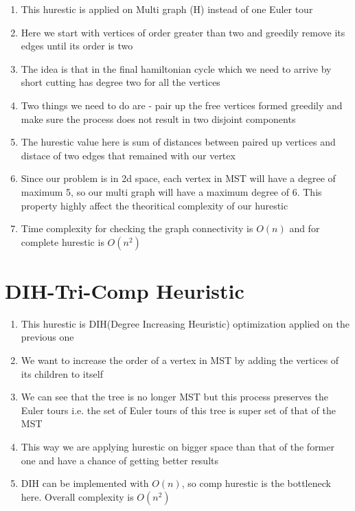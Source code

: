 \begin{enumerate}
    \item This hurestic is applied on Multi graph (H) instead of one Euler tour
    \item Here we start with vertices of order greater than two and greedily remove its edges until its order is two
    \item The idea is that in the final hamiltonian cycle which we need to arrive by short cutting has degree two for all the vertices
    \item Two things we need to do are - pair up the free vertices formed greedily and make sure the process does not result in two disjoint components
    \item The hurestic value here is sum of distances between paired up vertices and distace of two edges that remained with our vertex
    \item Since our problem is in 2d space, each vertex in MST will have a degree of maximum 5, so our multi graph will have a maximum degree of 6. This property highly affect the theoritical complexity of our hurestic
    \item Time complexity for checking the graph connectivity is $O(n)$ and for complete hurestic is $O(n^2)$
\end{enumerate}

\section{DIH-Tri-Comp Heuristic}

\begin{enumerate}
    \item This hurestic is DIH(Degree Increasing Heuristic) optimization applied on the previous one
    \item We want to increase the order of a vertex in MST by adding the vertices  of its children to itself
    \item We can see that the tree is no longer MST but this process preserves the Euler tours i.e. the set of Euler tours of this tree is super set of that of the MST
    \item This way we are applying hurestic on bigger space than that of the former one and have a chance of getting better results
    \item  DIH can be implemented with $O(n)$, so comp hurestic is the bottleneck here. Overall complexity is $O(n^2)$
\end{enumerate}





